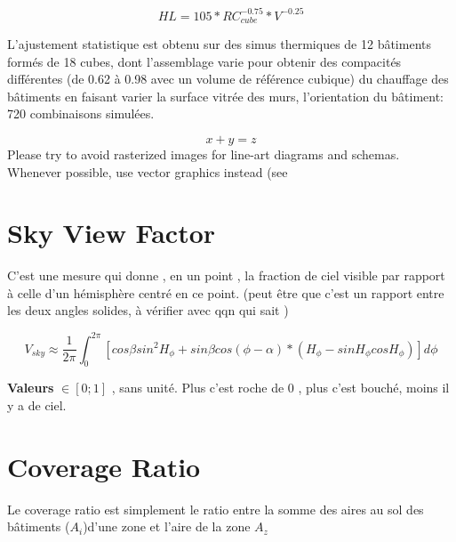 \documentclass[[a4paper, 11pt]{article}
\begin{document}
\begin{equation}
HL = 105*RC_{cube}^{-0.75} * V^{-0.25} 
\end{equation}

L'ajustement statistique est obtenu sur des simus thermiques de 12 bâtiments formés de 18 cubes, dont l'assemblage varie pour obtenir des compacités différentes (de 0.62 à 0.98 avec un volume de référence cubique)  du chauffage des bâtiments en faisant varier la surface vitrée des murs, l'orientation du bâtiment: 720 combinaisons simulées. 




\begin{equation}
x + y = z
\end{equation}
Please try to avoid rasterized images for line-art diagrams and
schemas. Whenever possible, use vector graphics instead (see



\section{Sky View Factor} %
\label{sec:sky_view_factor}


C'est une mesure qui donne , en un point , la fraction de ciel visible par rapport à celle d'un hémisphère centré en ce point.
(peut être que c'est un rapport entre les deux angles solides, à vérifier avec qqn qui sait )



\begin{equation}
 V_{sky} \approx \frac{1}{2\pi}\int_0^{2\pi}[cos \beta sin^2 H_{\phi} + sin \beta cos(\phi -\alpha)*(H_{\phi}-sinH_{\phi} cosH_{\phi}) ]d\phi	
\end{equation}


\textbf{Valeurs} $\in [0;1]$ , sans unité.
Plus c'est roche de 0 , plus c'est bouché, moins il y a de ciel.



\section{Coverage Ratio}

Le coverage ratio est simplement le ratio entre la somme des aires au sol des bâtiments ($A_i$)d'une zone et l'aire de la zone $A_z$
\end{document}
